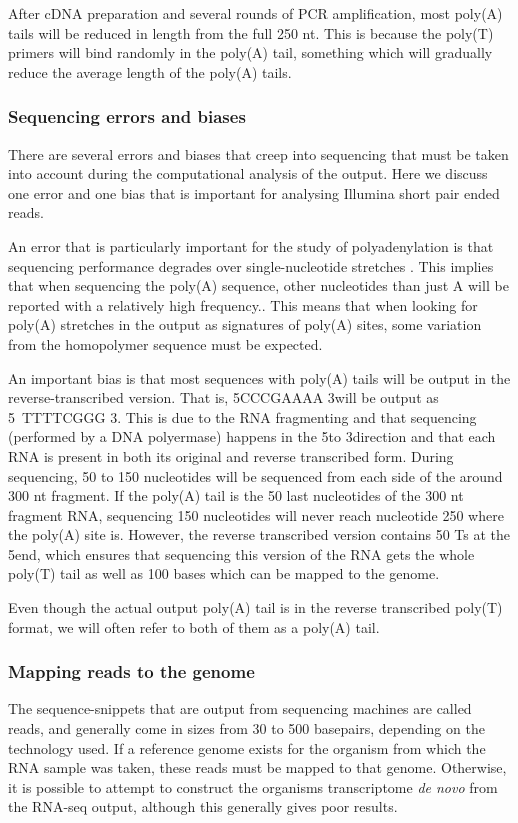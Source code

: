 After cDNA preparation and several rounds of PCR amplification, most poly(A)
tails will be reduced in length from the full 250 nt. This is because the
poly(T) primers will bind randomly in the poly(A) tail, something which will
gradually reduce the average length of the poly(A) tails.

\subsubsection{Sequencing errors and biases}
There are several errors and biases that creep into sequencing that must be
taken into account during the computational analysis of the output. Here we
discuss one error and one bias that is important for analysing Illumina short
pair ended reads.

An error that is particularly important for the study of polyadenylation is
that sequencing performance degrades over single-nucleotide stretches
\cite{minoche_evaluation_2011}. This implies that when sequencing the poly(A)
sequence, other nucleotides than just A will be reported with a relatively high
frequency.. This means that when looking for poly(A) stretches in the output as
signatures of poly(A) sites, some variation from the homopolymer sequence must
be expected.

An important bias is that most sequences with poly(A) tails will be output in
the reverse-transcribed version. That is, 5\p CCCGAAAA 3\p will be output as 5\
TTTTCGGG 3\p. This is due to the RNA fragmenting and that sequencing
(performed by a DNA polyermase) happens in the 5\p to 3\p direction and that
each RNA is present in both its original and reverse transcribed form. During
sequencing, 50 to 150 nucleotides will be sequenced from each side of the around
300 nt fragment. If the poly(A) tail is the 50 last nucleotides of the 300 nt
fragment RNA, sequencing 150 nucleotides will never reach nucleotide 250 where
the poly(A) site is. However, the reverse transcribed version contains 50 Ts at
the 5\p end, which ensures that sequencing this version of the RNA gets the
whole poly(T) tail as well as 100 bases which can be mapped to the genome.

Even though the actual output poly(A) tail is in the reverse transcribed
poly(T) format, we will often refer to both of them as a poly(A) tail.

\subsubsection{Mapping reads to the genome}
The sequence-snippets that are output from sequencing machines are called
reads, and generally come in sizes from 30 to 500 basepairs, depending on the
technology used. If a reference genome exists for the organism from which the
RNA sample was taken, these reads must be mapped to that genome. Otherwise, it
is possible to attempt to construct the organisms transcriptome \textit{de
novo} from the RNA-seq output, although this generally gives poor results.

